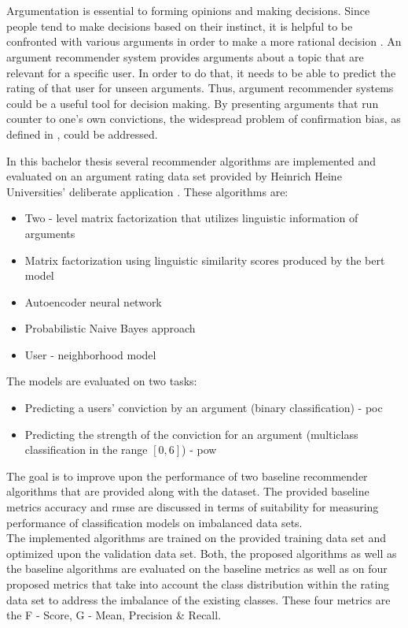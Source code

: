 \section*{}

Argumentation is essential to forming opinions and making decisions. Since people tend to make decisions based on their instinct, it is helpful to be confronted with various arguments in order to make a more rational decision \cite{klein2017sources}. An argument recommender system provides arguments about a topic that are relevant for a specific user. In order to do that, it needs to be able to predict the rating of that user for unseen arguments. Thus, argument recommender systems could be a useful tool for decision making. By presenting arguments that run counter to one's own convictions, the widespread problem of confirmation bias, as defined in \cite{nickerson1998confirmation}, could be addressed. 

In this bachelor thesis several recommender algorithms are implemented and evaluated on an argument rating data set provided by Heinrich Heine Universities' deliberate application \cite{brenneis2020deliberate}. These algorithms are:
\begin{itemize}
    \item Two - level matrix factorization that utilizes linguistic information of arguments
    \item Matrix factorization using linguistic similarity scores produced by the \acrfull{bert} model
    \item Autoencoder neural network
    \item Probabilistic Naive Bayes approach
    \item User - neighborhood model
\end{itemize}
The models are evaluated on two tasks:
\begin{itemize}
    \item Predicting a users' conviction by an argument (binary classification) - \acrfull{poc}
    \item Predicting the strength of the conviction for an argument (multiclass classification in the range $[0,6]$) - \acrfull{pow}
\end{itemize}

The goal is to improve upon the performance of two baseline recommender algorithms that are provided along with the dataset.
The provided baseline metrics accuracy and \acrfull{rmse} are discussed in terms of suitability for measuring performance of classification models on imbalanced data sets.\\
The implemented algorithms are trained on the provided training data set and optimized upon the validation data set. Both, the proposed algorithms as well as the baseline algorithms are evaluated on the baseline metrics as well as on four proposed metrics that take into account the class distribution within the rating data set to address the imbalance of the existing classes. These four metrics are the F - Score, G - Mean, Precision \& Recall. 

